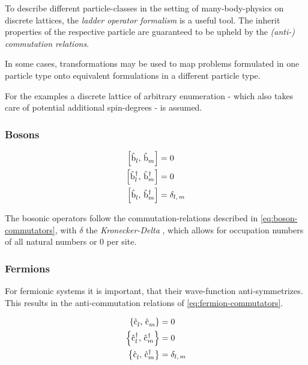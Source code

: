 To describe different particle-classes in the setting of many-body-physics on discrete lattices, the \emph{ladder operator formalism} is a useful tool. 
The inherit properties of the respective particle are guaranteed to be upheld by the \emph{(anti-) commutation relations}.

In some cases, transformations may be used to map problems formulated in one particle type onto equivalent formulations in a different particle type.

For the examples a discrete lattice of arbitrary enumeration - which also takes care of potential additional spin-degrees - is assumed.

\subsubsection*{Bosons}

\begin{equation}
    \label{eq:boson-commutators}
    \begin{split}
        \left[\hat{\text{b}}^{ }_{l},\,\hat{\text{b}}^{ }_{m}\right] &= 0\\
        \left[\hat{\text{b}}^{\dagger }_{l},\,\hat{\text{b}}^{\dagger }_{m}\right] &= 0\\
        \left[\hat{\text{b}}^{ }_{l},\,\hat{\text{b}}^{\dagger }_{m}\right] &= \delta_{l,\,m}\\
    \end{split}
\end{equation}

The bosonic operators follow the commutation-relations described in \autoref{eq:boson-commutators}, with $\delta$ the \emph{Kronecker-Delta} \cite{schwablBookII}, which allows for occupation numbers of all natural numbers or $0$ per site.

\subsubsection*{Fermions}

For fermionic systems it is important, that their wave-function anti-symmetrizes. This results in the anti-commutation relations of  \autoref{eq:fermion-commutators}.

\begin{equation}
    \label{eq:fermion-commutators}
    \begin{split}
        \left\{\hat{\text{c}}^{ }_{l},\,\hat{\text{c}}^{ }_{m}\right\} &= 0\\
        \left\{\hat{\text{c}}^{\dagger }_{l},\,\hat{\text{c}}^{\dagger }_{m}\right\} &= 0\\
        \left\{\hat{\text{c}}^{ }_{l},\,\hat{\text{c}}^{\dagger }_{m}\right\} &= \delta_{l,\,m}\\
    \end{split}
\end{equation}

